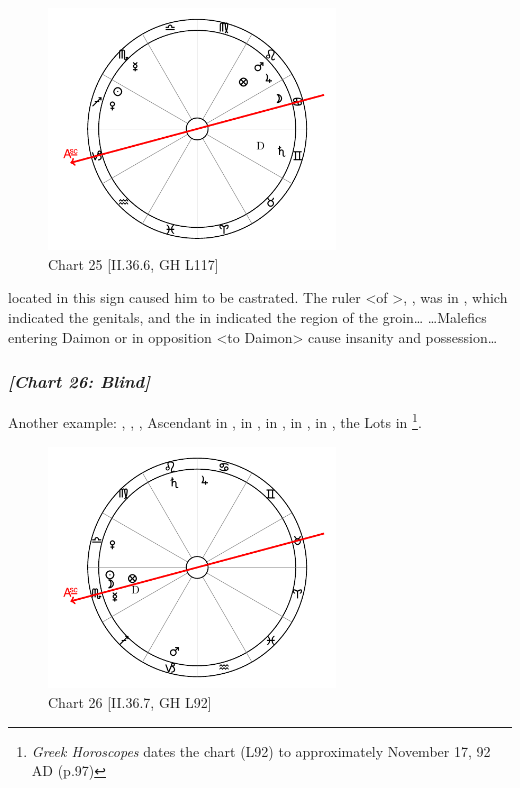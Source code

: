 \clearpage
\begin{figure}
\centering
\vspace{-20pt}
\includegraphics[width=0.68\textwidth]{charts/2_36_6}
\caption{Chart 25 [II.36.6, GH L117]}
\label{fig:chart25}
\end{figure}

\noindent \Saturn\xspace located in this sign caused him to be castrated. The ruler <of \Gemini>, \Mercury, was in \Scorpio, which indicated the genitals, and the \Sun\xspace in \Sagittarius\xspace indicated the region of the groin\ldots
\ldots Malefics entering Daimon or in opposition <to Daimon> cause insanity and possession\ldots

\newpage
\subsubsection{\textit{[Chart 26: Blind]}}
Another example: \Sun, \Moon, \Mercury, Ascendant in \Scorpio, \Saturn\xspace in \Leo, \Jupiter\xspace in \Cancer, \Mars\xspace in \Capricorn, \Venus\xspace in \Libra, the Lots in \Scorpio
\footnote{\textit{Greek Horoscopes} dates the chart (L92) to approximately November 17, 92 AD (p.97)}. 

\clearpage
\begin{figure}
\centering
\vspace{-20pt}
\includegraphics[width=0.68\textwidth]{charts/2_36_7}
\caption{Chart 26 [II.36.7, GH L92]}
\label{fig:chart26}
\end{figure}

